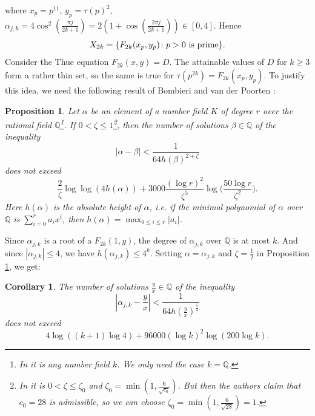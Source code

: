\documentclass[12pt]{amsart}
\newtheorem{cor}[thm]{Corollary}
\newtheorem{prop}[thm]{Proposition}
\newcommand{\Q}{\mathbb{Q}}
\numberwithin{equation}{section}
\begin{document}
where $x_p=p^{11}$, $y_p=\tau(p)^2$, $\alpha_{j,k}=4\cos^2{(\frac{\pi j}{2k+1})}=2(1+\cos{(\frac{2\pi j}{2k+1})})\in[0,4]$. Hence $$X_{2k}=\{F_{2k}(x_p,y_p)\colon p>0 \textup{ is prime}\}.$$
Consider the Thue equation $F_{2k}(x,y) = D$. The attainable values of $D$ for $k \geq 3$ form a rather thin set, so the same is true for $\tau(p^{2k})=F_{2k}(x_p,y_p)$. To justify this idea, we need the following result of Bombieri and van der Poorten \cite{Bombieri}:
\begin{prop}\label{5}
    Let $\alpha$ be an element of a number field $K$ of degree $r$ over the rational field $\mathbb{Q}$\footnote{In \cite{Bombieri} it is any number field $k$. We only need the case $k=\Q$.}. If $0<\zeta\leq1$\footnote{In \cite{Bombieri} it is $0<\zeta\leq\zeta_0$ and $\zeta_0=\min(1,\frac{6}{\sqrt{c_0}})$. But then the authors claim that $c_0=28$ is admissible, so we can choose $\zeta_0=\min(1,\frac{6}{\sqrt{28}})=1$.}, then the number of solutions $\beta\in\mathbb{Q}$ of the inequality\begin{equation}
        |\alpha-\beta|<\frac{1}{64h(\beta)^{2+\zeta}}
    \end{equation}
    does not exceed\begin{equation*}
        \frac{2}{\zeta}\log\log(4h(\alpha))+3000\frac{(\log r)^2}{\zeta^5}\log\bigg(\frac{50\log r}{\zeta^2}\bigg).
    \end{equation*}
    Here $h(\alpha)$ is the absolute height of $\alpha$, i.e. if the minimal polynomial of $\alpha$ over $\mathbb{Q}$ is $\sum_{i=0}^r a_ix^i$, then $h(\alpha)=\max_{0\leq i\leq r}|a_i|$.
\end{prop}
Since $\alpha_{j,k}$ is a root of a $F_{2k}(1,y)$, the degree of $\alpha_{j,k}$ over $\mathbb{Q}$ is at most $k$. And since $|\alpha_{j,k}|\leq 4$, we have $h(\alpha_{j,k})\leq 4^k$. Setting $\alpha=\alpha_{j,k}$ and $\zeta=\frac{1}{2}$ in Proposition \ref{5}, we get:
\begin{cor}\label{7}
    The number of solutions $\frac{y}{x}\in\mathbb{Q}$ of the inequality\begin{equation*}
        |\alpha_{j,k}-\frac{y}{x}|<\frac{1}{64h(\frac{y}{x})^\frac{5}{2}}
    \end{equation*}
    does not exceed
    \begin{equation*}
        4\log((k+1)\log 4)+96000(\log k)^2\log(200\log k).
    \end{equation*}
\end{cor}
\end{document}
